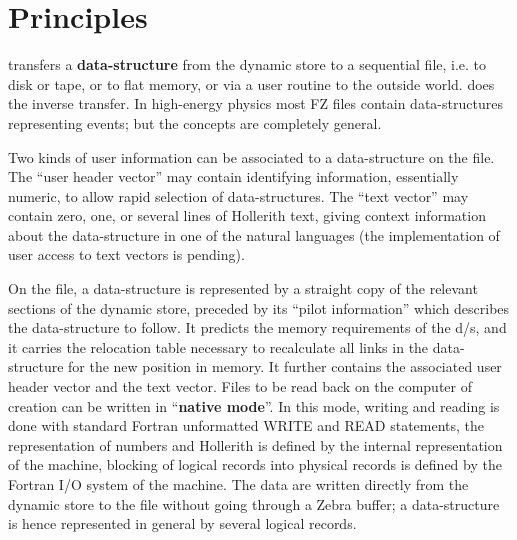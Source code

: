 \chapter{Principles}

 transfers a \textbf{data-structure}
from the dynamic store to a sequential file, i.e. to disk or tape,
or to flat memory, or via a user routine to the outside world.
 does the inverse transfer.
In high-energy physics most FZ files contain data-structures
representing events; but the concepts are completely general.

Two kinds of user information can be associated to a
data-structure on the file.
The ``user header vector'' may contain identifying information,
essentially numeric, to allow rapid selection of data-structures.
The ``text vector'' may contain zero,
one, or several lines of Hollerith text,
giving context information about the data-structure in one of the
natural languages
(the implementation of user access to text vectors is pending).

On the file, a data-structure is represented by a straight
copy of the relevant sections of the dynamic store,
preceded by its ``pilot information'' which describes
the data-structure to follow.
It predicts the memory requirements of the d/s,
and it carries the relocation table necessary to recalculate all
links in the data-structure for the new position in memory.
It further contains the associated user header vector
and the text vector.
Files to be read back on the computer of creation can be written in
``\textbf{native mode}''.
In this mode, writing and reading is done with standard Fortran
unformatted WRITE and READ statements,
the representation of numbers and Hollerith is defined by the
internal representation of the machine,
blocking of logical records into physical records is defined by the
Fortran I/O system of the machine.
The data are written directly from the dynamic store to the file
without going through a Zebra buffer;
a data-structure is hence represented in general by several
logical records.


